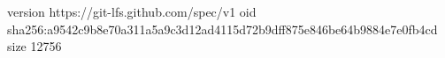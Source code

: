 version https://git-lfs.github.com/spec/v1
oid sha256:a9542c9b8e70a311a5a9c3d12ad4115d72b9dff875e846be64b9884e7e0fb4cd
size 12756
